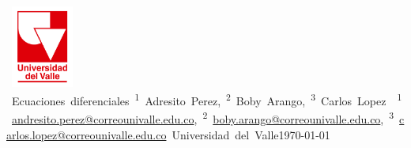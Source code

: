 \documentclass{article}
\makeatletter
\def\titulo{Ecuaciones diferenciales}
\def\autores{%
    \textsuperscript{1}~Adresito Perez,
    \textsuperscript{2}~Boby Arango,
    \textsuperscript{3}~Carlos Lopez
}
\def\correos{%
    \textsuperscript{1}~\url{andresito.perez@correounivalle.edu.co},
    \textsuperscript{2}~\url{boby.arango@correounivalle.edu.co},
    \textsuperscript{3}~\url{carlos.lopez@correounivalle.edu.co}
}
\def\institucion{Universidad del Valle}
\makeatother
\begin{document}

\hbox{
    \vbox{\hsize=1in \centering
        \includegraphics[width=0.8in]{recursos/RojoTransparenteUV.png}
        \vspace{25pt}
    }
    \vbox{\hsize=5in \centering
        {\huge\titulo}
        \\ \vspace{10pt}
        {\autores}
        \\ \vspace{0pt}
        {\correos}
        \\ \vspace{10pt}
        {\large\institucion}
        \\ \vspace{10pt}
        {\today}
        \\ \vspace{0pt}
    }
}





\begin{multicols}{2}








\printbibliography

\end{multicols}
\end{document}
